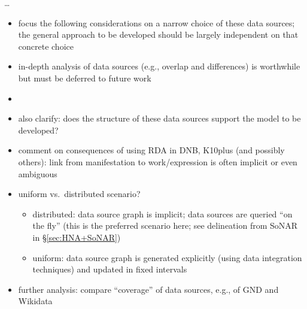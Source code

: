 \dots


\begin{itemize}
  \item
    focus the following considerations on a narrow choice of these data sources;
    the general approach to be developed should be largely independent on that concrete choice
  \item 
    in-depth analysis of data sources (e.g., overlap and differences) is worthwhile
    but must be deferred to future work
  \item
  \item
    also clarify: does the structure of these data sources support the model to be developed?
  \item
    comment on consequences of using RDA in DNB, K10plus (and possibly others): link from manifestation to work/expression is often implicit or even ambiguous
  \item 
    uniform vs.\ distributed scenario?
    \begin{itemize}
      \item
        distributed: data source graph is implicit; data sources are queried \enquote{on the fly}
        (this is the preferred scenario here; see delineation from SoNAR in §\ref{sec:HNA+SoNAR})
      \item
        uniform: data source graph is generated explicitly (using data integration techniques)
        and updated in fixed intervals
    \end{itemize}
  \item
    further analysis: compare \enquote{coverage} of data sources, e.g., of GND and Wikidata
\end{itemize}


